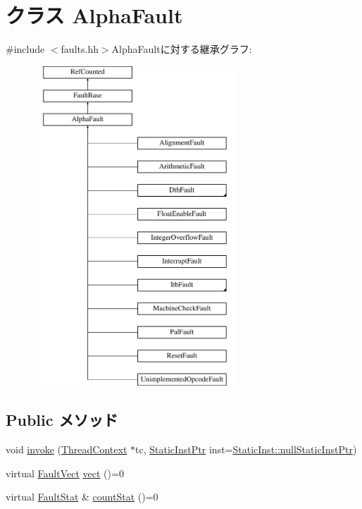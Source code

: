 \hypertarget{classAlphaISA_1_1AlphaFault}{
\section{クラス AlphaFault}
\label{classAlphaISA_1_1AlphaFault}
}


{\ttfamily \#include $<$faults.hh$>$}AlphaFaultに対する継承グラフ:\begin{figure}[H]
\begin{center}
\leavevmode
\includegraphics[height=12cm]{classAlphaISA_1_1AlphaFault}
\end{center}
\end{figure}
\subsection*{Public メソッド}
\begin{DoxyCompactItemize}
\item 
void \hyperlink{classAlphaISA_1_1AlphaFault_a2bd783b42262278d41157d428e1f8d6f}{invoke} (\hyperlink{classThreadContext}{ThreadContext} $\ast$tc, \hyperlink{classRefCountingPtr}{StaticInstPtr} inst=\hyperlink{classStaticInst_aa793d9793af735f09096369fb17567b6}{StaticInst::nullStaticInstPtr})
\item 
virtual \hyperlink{classm5_1_1params_1_1Addr}{FaultVect} \hyperlink{classAlphaISA_1_1AlphaFault_ac141ef2ab527bd4d5c079ddff2e8b4aa}{vect} ()=0
\item 
virtual \hyperlink{classStats_1_1Scalar}{FaultStat} \& \hyperlink{classAlphaISA_1_1AlphaFault_a5d92ccd11b5cd6b04f02bd0a088b776c}{countStat} ()=0
\end{DoxyCompactItemize}
